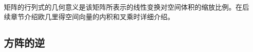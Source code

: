 \begin{note}
    矩阵的行列式的几何意义是该矩阵所表示的线性变换对空间体积的缩放比例。在后续章节介绍欧几里得空间向量的内积和叉乘时详细介绍。
\end{note}


    


\vspace{1em}
\subsection{方阵的逆}

